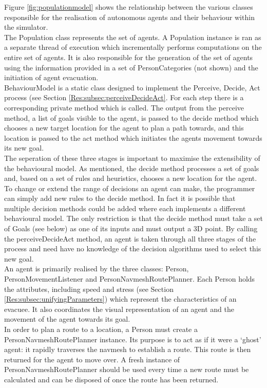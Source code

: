 Figure \ref{fig:populationmodel} shows the relationship between the various classes responsible
for the realisation of autonomous agents and their behaviour within the simulator.
\\
The Population class represents the set of agents. A Population instance is ran as a separate thread of execution which
incrementally performs computations on the entire set of agents. It is also responsible
for the generation of the set of agents using the information provided in a set of PersonCategories (not shown) and the initiation
of agent evacuation.
\\
BehaviourModel is a static class designed to implement the Perceive, Decide, Act process (see Section \ref{Res:subsec:perceiveDecideAct}. For each step there is a corresponding 
private method which is called. The output from the perceive method, a list of goals visible to the agent, is passed to the decide method
which chooses a new target location for the agent to plan a path towards, and this location is passed to the act method which initiates the agents
movement towards its new goal.
\\
The seperation of these three stages is important to maximise the extensibility of the behavioural model. As mentioned, the decide method processes a set of
goals and, based on a set of rules and heuristics, chooses a new location for the agent. To change or extend the range of decisions an agent can make,
the programmer can simply add new rules to the decide method. In fact it is possible that multiple decision methods could be added where each implements
a different behavioural model. The only restriction is that the decide method must take a set of Goals (see below) as one of its inputs and must output a 3D point.
By calling the perceiveDecideAct method, an agent is taken through all three stages of the process and need have no knowledge of the decision algorithms used to select this new goal.
\\

An agent is primarily realised by the three classes: Person, PersonMovementListener and PersonNavmeshRoutePlanner. 
Each Person holds the attributes, including speed and stress (see Section \ref{Res:subsec:unifyingParameters}) which represent the characteristics of 
an evacuee. It also coordinates the visual representation of an agent and the movement of the agent towards its goal.
\\
In order to plan a route to a location, a Person must create a PersonNavmeshRoutePlanner instance. Its purpose is to act 
as if it were a `ghost' agent: it rapidly traverses the navmesh to establish a route. This route is then returned for the 
agent to move over. A fresh instance of PersonNavmeshRoutePlanner should be used every time a new route must be calculated and can be disposed
of once the route has been returned.
